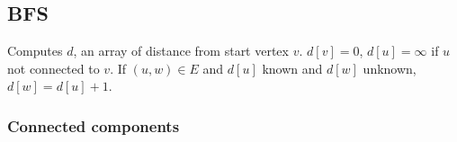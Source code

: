 \subsection{BFS}
Computes $d$, an array of distance from start vertex $v$.
$d[v]=0$, $d[u]=\infty$ if $u$ not connected to $v$. If $(u, w)\in E$ and $d[u]$ known and $d[w]$ unknown, $d[w] = d[u]+1$.\\

\subsubsection{Connected components}

